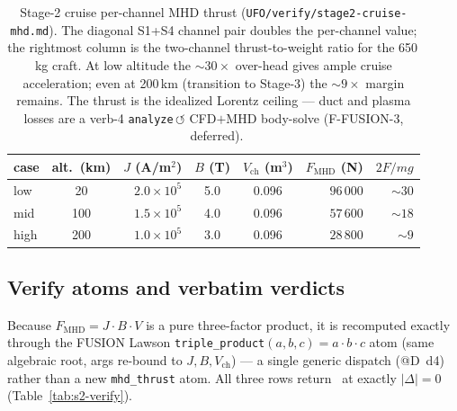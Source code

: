 \begin{table}[h]
\centering
\small
\setlength{\tabcolsep}{5pt}
\begin{tabular}{@{}l c r c c r r@{}}
\toprule
\textbf{case} & \textbf{alt.\ (km)} & \textbf{$J$ (A/m$^2$)} & \textbf{$B$ (T)} & \textbf{$V_{\text{ch}}$ (m$^3$)} & \textbf{$F_{\text{MHD}}$ (N)} & \textbf{$2F/mg$} \\
\midrule
low  & 20  & $2.0\times10^5$ & 5.0 & 0.096 & $96\,000$ & $\sim\!30$ \\
mid  & 100 & $1.5\times10^5$ & 4.0 & 0.096 & $57\,600$ & $\sim\!18$ \\
high & 200 & $1.0\times10^5$ & 3.0 & 0.096 & $28\,800$ & $\sim\!9$  \\
\bottomrule
\end{tabular}
\caption{Stage-2 cruise per-channel MHD thrust
(\texttt{UFO/verify/stage2-cruise-mhd.md}). The diagonal S1+S4 channel
pair doubles the per-channel value; the rightmost column is the
two-channel thrust-to-weight ratio for the 650\,kg craft. At low altitude
the $\sim\!30\times$ over-head gives ample cruise acceleration; even at
200\,km (transition to Stage-3) the $\sim\!9\times$ margin remains. The
thrust is the idealized Lorentz ceiling --- duct and plasma losses are a
verb-4 \texttt{analyze}\,$\circlearrowleft$ CFD$+$MHD body-solve
(F-FUSION-3, \tierOrange\ deferred).}
\label{tab:s2-thrust}
\end{table}

\subsection{Verify atoms and verbatim verdicts}
\label{app:stage2-verify}

Because $F_{\text{MHD}}=J\!\cdot\!B\!\cdot\!V$ is a pure three-factor
product, it is recomputed exactly through the FUSION Lawson
\verb|triple_product|$(a,b,c)=a\!\cdot\!b\!\cdot\!c$ atom (same algebraic
root, args re-bound to $J,B,V_{\text{ch}}$) --- a single generic dispatch
(@D~d4) rather than a new \verb|mhd_thrust| atom. All three rows return
\tierGreen\ at exactly $|\Delta|=0$ (Table~\ref{tab:s2-verify}).

